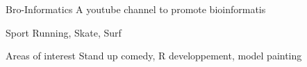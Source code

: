 
\begin{cvskills}

  \cvskill
    {Bro-Informatics} %
    {A youtube channel to promote bioinformatis} %

  \cvskill
    {Sport} %
    {Running, Skate, Surf} %
    
  \cvskill
    {Areas of interest} %
    {Stand up comedy, R developpement, model painting} %
    
\end{cvskills}